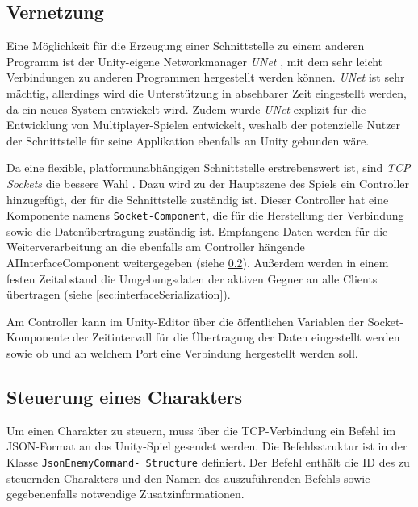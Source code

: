 \subsection{Vernetzung}\label{sec:interfaceSocket}

Eine Möglichkeit für die Erzeugung einer Schnittstelle zu einem anderen Programm ist der Unity-eigene Networkmanager \textit{UNet} \cite{Unity_Doc_UNet}, mit dem sehr leicht Verbindungen zu anderen Programmen hergestellt werden können. \textit{UNet} ist sehr mächtig, allerdings wird die Unterstützung in absehbarer Zeit eingestellt werden, da ein neues System entwickelt wird. Zudem wurde \textit{UNet} explizit für die Entwicklung von Multiplayer-Spielen entwickelt, weshalb der potenzielle Nutzer der Schnittstelle für seine Applikation ebenfalls an Unity gebunden wäre.

Da eine flexible, platformunabhängigen Schnittstelle erstrebenswert ist, sind \textit{TCP Sockets} die bessere Wahl \cite{Microsoft_Socket}. Dazu wird zu der Hauptszene des Spiels ein Controller hinzugefügt, der für die Schnittstelle zuständig ist. Dieser Controller hat eine Komponente namens \texttt{Socket-\linebreak Component}, die für die Herstellung der Verbindung sowie die Datenübertragung zuständig ist. Empfangene Daten werden für die Weiterverarbeitung an die ebenfalls am Controller hängende AIInterfaceComponent weitergegeben (siehe \ref{sec:interfaceControls}). Außerdem werden in einem festen Zeitabstand die Umgebungsdaten der aktiven Gegner an alle Clients übertragen (siehe \ref{sec:interfaceSerialization}).

Am Controller kann im Unity-Editor über die öffentlichen Variablen der Socket-Komponente der Zeitintervall für die Übertragung der Daten eingestellt werden sowie ob und an welchem Port eine Verbindung hergestellt werden soll.

\subsection{Steuerung eines Charakters}\label{sec:interfaceControls}

Um einen Charakter zu steuern, muss über die TCP-Verbindung ein Befehl im JSON-Format an das Unity-Spiel gesendet werden. Die Befehlsstruktur ist in der Klasse \texttt{JsonEnemyCommand- \linebreak Structure} definiert. Der Befehl enthält die ID des zu steuernden Charakters und den Namen des auszuführenden Befehls sowie gegebenenfalls notwendige Zusatzinformationen.

